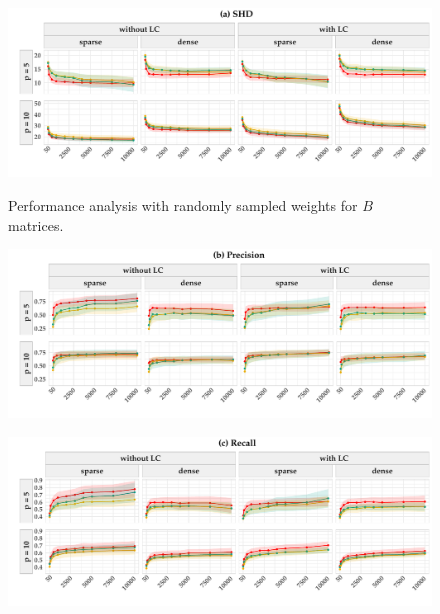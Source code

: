 \documentclass[twoside, 11pt]{article}
\begin{document}
\begin{appendices}
\vspace{5mm}
\begin{figure}[!hb]
    \centering
        \caption{Performance analysis with randomly sampled weights for $B$ matrices.}
        \includegraphics[width=1\textwidth]{figures/samplingbeta_shd.pdf}
        \label{fig:G1}
\end{figure}  

\begin{figure}[H]\ContinuedFloat
    \centering
        \includegraphics[width=1\textwidth]{figures/samplingbeta_prec.pdf}
\end{figure}    

\begin{figure}[H]\ContinuedFloat
    \centering
        \includegraphics[width=1\textwidth]{figures/samplingbeta_rec.pdf}
\end{figure}    


\end{appendices}
\end{document}
